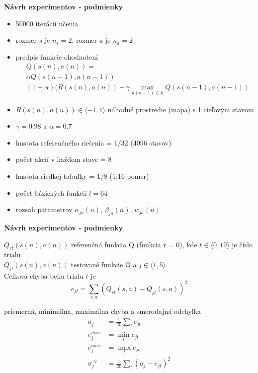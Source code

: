 \documentclass[xcolor=dvipsnames]{beamer}
\begin{document}
\begin{frame}{\bf Návrh experimentov - podmienky}

\begin{itemize}
\item 50000 iterácií učenia
\item rozmer $s$ je $n_s = 2$, rozmer $a$ je $n_a = 2$
\item predpis funkcie ohodnotení
\begin{align}
&Q(s(n),a(n)) = \nonumber \\
&\alpha Q(s(n-1),a(n-1)) \nonumber \\
&(1- \alpha)(R(s(n),a(n)) + \gamma \max_{a(n-1) \in \mathbb{A}} Q(s(n-1), a(n-1)) \nonumber
\end{align}

\item $R(s(n), a(n)) \in \langle -1, 1 \rangle$ náhodné prostredie (mapa) s 1 cieľovým stavom
\item $\gamma = 0.98$ a $\alpha = 0.7$
\item hustota referenčného riešenia = 1/32  (4096 stavov)
\item počet akcií v každom stave = 8
\item hustota riedkej tabuľky = 1/8  (1:16 pomer)
\item počet bázických funkcií $l = 64$
\item rozsah parametrov $\alpha_{ja}(n)$, $\beta_{ja}(n)$, $w_{ja}(n)$
\end{itemize}

\end{frame}


\begin{frame}{\bf Návrh experimentov - podmienky}

$Q_{rt}(s(n),a(n))$ referenčná funkcia Q (funkcia r = 0), kde $t \in \langle 0, 19 \rangle $ je číslo trialu  \\
$Q_{jt}(s(n),a(n))$ testované funkcie Q a $j \in \langle 1, 5 \rangle $. \\

Celková chyba behu trialu $t$ je \\
\begin{equation}
e_{jt} = \sum\limits_{s, a}{(Q_{rt}(s,a) - Q_{jt}(s,a))^2}  \nonumber
\end{equation}

priemerná, minimálna, maximálna chyba a smerodajná odchylka \\
\begin{align}
\bar{a_j} &= \frac{1}{20}\sum\limits_{t}{e_{jt}}  \nonumber \\
{e^{min}_j} &= \min_{t}{e_{jt}}  \nonumber \\
{e^{max}_j} &= \max_{t}{e_{jt}}  \nonumber \\
{\sigma_j}^2 &= \frac{1}{20}\sum\limits_{t}{(\bar{a_j} - e_{jt})^2}  \nonumber
\end{align}

\end{frame}
\end{document}
